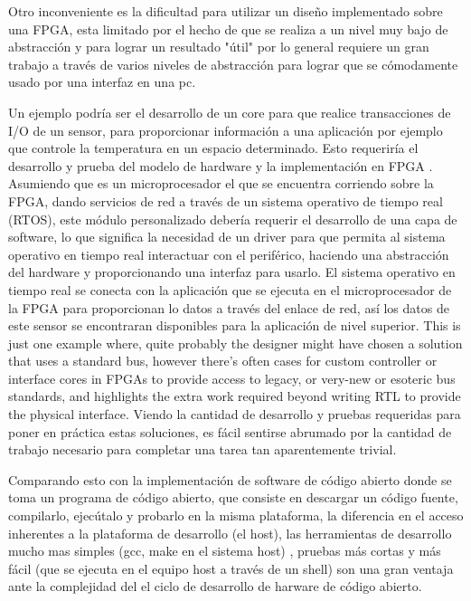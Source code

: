 Otro inconveniente es la dificultad para utilizar un diseño implementado sobre una FPGA, esta limitado por el hecho de que se realiza a un nivel muy bajo de abstracción y para lograr un resultado "útil" por lo general requiere un gran trabajo a través de varios niveles de abstracción para lograr que se cómodamente usado por una interfaz en una pc.

Un ejemplo podría ser el desarrollo de un core para que realice transacciones de I/O de un sensor, para proporcionar información a una aplicación por ejemplo que controle la temperatura en un espacio determinado. Esto requeriría el desarrollo y prueba del modelo de hardware y la implementación en FPGA . Asumiendo que es un microprocesador el que se encuentra corriendo sobre la FPGA, dando servicios de red a través de un sistema operativo de tiempo real (RTOS), este módulo personalizado debería requerir el desarrollo de una capa de software, lo que significa la necesidad de un driver para que permita al sistema operativo en tiempo real interactuar con el periférico, haciendo una abstracción del hardware y proporcionando una interfaz para usarlo. El sistema operativo en tiempo real se conecta con la aplicación que se ejecuta en el microprocesador de la FPGA para proporcionan lo datos a través del enlace de red, así los datos de este sensor se encontraran disponibles para la aplicación de nivel superior. This is just one example where, quite probably the designer might have chosen a solution that uses a standard bus, however there’s often cases for custom controller or interface cores in FPGAs to provide
access to legacy, or very-new or esoteric bus standards, and highlights the extra work required beyond writing RTL to provide the physical interface.
Viendo la cantidad de desarrollo y pruebas requeridas para poner en práctica estas soluciones, es fácil sentirse abrumado por la cantidad de trabajo necesario para completar una tarea tan aparentemente trivial.

Comparando esto con la implementación de software de código abierto donde se toma un programa de código abierto, que consiste en descargar un código fuente, compilarlo, ejecútalo y probarlo en la misma plataforma, la diferencia en el acceso inherentes a la plataforma de desarrollo (el host), las herramientas de desarrollo mucho mas simples (gcc, make en el sistema host) , pruebas más cortas y más fácil (que se ejecuta en el equipo host a través de un shell) son una gran ventaja ante la complejidad del el ciclo de desarrollo de harware de código abierto.



